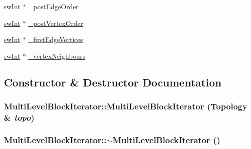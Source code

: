 \begin{DoxyCompactItemize}
\item 
\hyperlink{swMacro_8h_a113cf5f6b5377cdf3fac6aa4e443e9aa}{swInt} $\ast$ \hyperlink{classMultiLevelBlockIterator_a72ac8d61d98eb9ab3e95db11e8eb4592}{\_\-postEdgeOrder}
\item 
\hyperlink{swMacro_8h_a113cf5f6b5377cdf3fac6aa4e443e9aa}{swInt} $\ast$ \hyperlink{classMultiLevelBlockIterator_a68c79e502eb1bae881fe08b25eeea2e3}{\_\-postVertexOrder}
\item 
\hyperlink{swMacro_8h_a113cf5f6b5377cdf3fac6aa4e443e9aa}{swInt} $\ast$ \hyperlink{classMultiLevelBlockIterator_ad01e907226fdf1af73ce3bc3ef11ef46}{\_\-firstEdgeVertices}
\item 
\hyperlink{swMacro_8h_a113cf5f6b5377cdf3fac6aa4e443e9aa}{swInt} $\ast$ \hyperlink{classMultiLevelBlockIterator_a8e339eb75b0dfb8a789d9db1727b73c4}{\_\-vertexNeighbours}
\end{DoxyCompactItemize}


\subsection{Constructor \& Destructor Documentation}
\hypertarget{classMultiLevelBlockIterator_a6d43aae7b5472800853effe7fb4c122a}{
\subsubsection[{MultiLevelBlockIterator}]{\setlength{\rightskip}{0pt plus 5cm}MultiLevelBlockIterator::MultiLevelBlockIterator ({\bf Topology} \& {\em topo})}}
\label{classMultiLevelBlockIterator_a6d43aae7b5472800853effe7fb4c122a}
\hypertarget{classMultiLevelBlockIterator_ae18852417b5b2b7db13b4aa727afa106}{
\subsubsection[{$\sim$MultiLevelBlockIterator}]{\setlength{\rightskip}{0pt plus 5cm}MultiLevelBlockIterator::$\sim$MultiLevelBlockIterator ()}}
\label{classMultiLevelBlockIterator_ae18852417b5b2b7db13b4aa727afa106}


